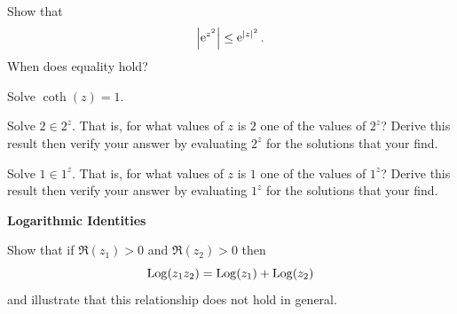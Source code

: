 {\begin{Exercise}
\end{Exercise}


\begin{Exercise}
  \label{exercise ez lt ez}
  Show that
  \[
  \left| \mathop{\mathrm{e}}\nolimits^{z^2} \right| \leq \mathop{\mathrm{e}}\nolimits^{|z|^2}.
  \]
  When does equality hold?

\end{Exercise}






\begin{Exercise}
  \label{exercise cothz = 1}
  Solve $\coth(z) = 1$.

\end{Exercise}



\begin{Exercise}
  \label{exercise 2 in 2z}
  Solve $2 \in 2^z$.  That is, for what values of $z$ is $2$ one of the values
  of $2^z$?  Derive this result then verify your answer by evaluating $2^z$
  for the solutions that your find.

\end{Exercise}




\begin{Exercise}
  \label{exercise 1 in 1z}
  Solve $1 \in 1^z$.  That is, for what values of $z$ is $1$ one of the values
  of $1^z$?  Derive this result then verify your answer by evaluating $1^z$
  for the solutions that your find.

\end{Exercise}




\begin{large}
  \noindent
  \textbf{Logarithmic Identities}
\end{large}






\begin{Exercise}
  \label{exercise Log z1z2}
  Show that if $\Re \left( z_1 \right) > 0$ and $\Re \left( z_2 \right) > 0$ then
  \[
  \mathop{\mathrm{Log}}\nolimits( z_1 z_2 ) = \mathop{\mathrm{Log}}\nolimits( z_1 ) + \mathop{\mathrm{Log}}\nolimits( z_2 )
  \]
  and illustrate that this relationship does not hold in general.


\end{Exercise}}
